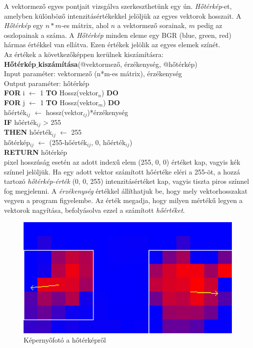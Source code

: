 A vektormező egyes pontjait vizsgálva szerkeszthetünk egy ún. \textit{Hőtérkép}-et, amelyben különböző intenzitásértékekkel jelöljük az egyes vektorok hosszait. A \textit{Hőtérkép} egy $n*m$-es mátrix, ahol $n$ a vektormező sorainak, $m$ pedig az oszlopainak a száma. A \textit{Hőtérkép} minden eleme egy BGR (blue, green, red) hármas értékkel van ellátva. Ezen értékek jelölik az egyes elemek színét.\\
Az értékek a következőképpen kerülnek kiszámításra:\\
\newline
\noindent \textbf{Hőtérkép$\_$kiszámítása}(@vektormező, érzékenység, @hőtérkép)\\ 
Input paraméter: vektormező (n*m-es mátrix), érzékenység\\
Output paraméter: hőtérkép\\
\textbf{FOR} i $\leftarrow$ 1 \textbf{TO} Hossz(vektor$_n$) \textbf{DO}\\
\indent \textbf{FOR} j $\leftarrow$ 1 \textbf{TO} Hossz(vektor$_m$) \textbf{DO}\\
\indent \indent hőérték$_{ij}$ $\leftarrow$ hossz(vektor$_{ij}$)*érzékenység\\
\indent \indent \textbf{IF} hőérték$_{ij}$ > 255\\
\indent \indent \indent \textbf{THEN} hőérték$_{ij}$ $\leftarrow$ 255\\
\indent \indent hőtérkép$_{ij}$ $\leftarrow$ (255-hőérték$_{ij}$, 0, hőérték$_{ij}$)\\
\textbf{RETURN} hőtérkép\\
 pixel hosszúság esetén az adott indexű elem (255, 0, 0) értéket kap, vagyis kék színnel jelöljük. Ha egy adott vektor számított hőértéke eléri a 255-öt, a hozzá tartozó \textit{hőtérkép-érték} (0, 0, 255) intenzitásértéket kap, vagyis tiszta piros színnel fog megjelenni.
A \textit{érzékenység} értékkel állíthatjuk be, hogy mely vektorhosszakat vegyen a program figyelembe. Az érték megadja, hogy milyen mértékű legyen a vektorok nagyítása, befolyásolva ezzel a számított \textit{hőértéket}.

\begin{figure}[h]
\centering
\includegraphics[width=11.2truecm, height=6.3truecm]{images/HeatMap_screenshot.png}
\caption{Képernyőfotó a hőtérképről}
\label{fig:heatmap}
\end{figure}

